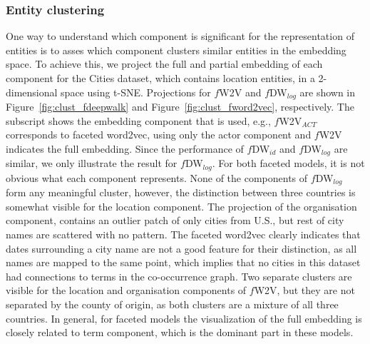 \subsubsection{Entity clustering} 
One way to understand which component is significant for the representation of entities is to asses which component clusters similar entities in the embedding space. To achieve this, we project the full and partial embedding of each component for the Cities dataset, which contains location entities, in a 2-dimensional space using t-SNE.  Projections for $f$W2V and $f$DW$_{log}$  are shown in Figure~\ref{fig:clust_fdeepwalk} and Figure~\ref{fig:clust_fword2vec}, respectively. The subscript shows the embedding component that is used, e.g., $f$W2V$_{ACT}$ corresponds to faceted word2vec, using only the actor component and $f$W2V indicates the full embedding. Since the performance of $f$DW$_{id}$ and  $f$DW$_{log}$ are similar, we only illustrate the result for $f$DW$_{log}$. For both faceted models, it is not obvious what each component represents. None of the components of $f$DW$_{log}$ form any meaningful cluster, however, the distinction between three countries is somewhat visible for the location component. The projection of the organisation component, contains an outlier patch of only cities from U.S., but rest of city names are scattered with no pattern. The faceted word2vec clearly indicates that dates surrounding a city name are not a good feature for their distinction, as all names are mapped to the same point, which implies that no cities in this dataset had connections to terms in the co-occurrence graph. Two separate clusters are visible for the location and organisation components of $f$W2V, but they are not separated by the county of origin, as both clusters are a mixture of all three countries. In general, for faceted models the visualization of the full embedding is closely related to term component, which is the dominant part in these models.
